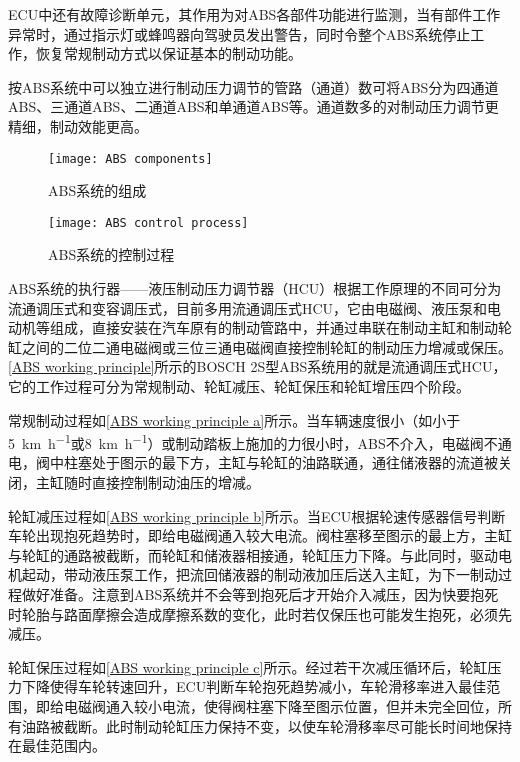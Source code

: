 \documentclass[UTF8]{ctexart}
\numberwithin{figure}{section}
\numberwithin{table}{section}
\begin{document}
ECU中还有故障诊断单元，其作用为对ABS各部件功能进行监测，当有部件工作异常时，通过指示灯或蜂鸣器向驾驶员发出警告，同时令整个ABS系统停止工作，恢复常规制动方式以保证基本的制动功能。

按ABS系统中可以独立进行制动压力调节的管路（通道）数可将ABS分为四通道ABS、三通道ABS、二通道ABS和单通道ABS等。通道数多的对制动压力调节更精细，制动效能更高。

\begin{figure}[htbp]
	\centering
	\begin{minipage}[b]{0.8\textwidth}
		\centering
		\texttt{[image: ABS components]}
		\caption{ABS系统的组成}
		\label{ABS components}
	\end{minipage}
	\begin{minipage}[b]{0.8\textwidth}
		\centering
		\texttt{[image: ABS control process]}
		\caption{ABS系统的控制过程}
		\label{ABS control process}
	\end{minipage}
\end{figure}

ABS系统的执行器——液压制动压力调节器（HCU）根据工作原理的不同可分为流通调压式和变容调压式，目前多用流通调压式HCU，它由电磁阀、液压泵和电动机等组成，直接安装在汽车原有的制动管路中，并通过串联在制动主缸和制动轮缸之间的二位二通电磁阀或三位三通电磁阀直接控制轮缸的制动压力增减或保压。\cref{ABS working principle}所示的BOSCH 2S型ABS系统用的就是流通调压式HCU，它的工作过程可分为常规制动、轮缸减压、轮缸保压和轮缸增压四个阶段。

常规制动过程如\cref{ABS working principle a}所示。当车辆速度很小（如小于\SI[per-mode = symbol]{5}{\km\per\hour}或\SI[per-mode = symbol]{8}{\km\per\hour}）或制动踏板上施加的力很小时，ABS不介入，电磁阀不通电，阀中柱塞处于图示的最下方，主缸与轮缸的油路联通，通往储液器的流道被关闭，主缸随时直接控制制动油压的增减。

轮缸减压过程如\cref{ABS working principle b}所示。当ECU根据轮速传感器信号判断车轮出现抱死趋势时，即给电磁阀通入较大电流。阀柱塞移至图示的最上方，主缸与轮缸的通路被截断，而轮缸和储液器相接通，轮缸压力下降。与此同时，驱动电机起动，带动液压泵工作，把流回储液器的制动液加压后送入主缸，为下一制动过程做好准备。注意到ABS系统并不会等到抱死后才开始介入减压，因为快要抱死时轮胎与路面摩擦会造成摩擦系数的变化，此时若仅保压也可能发生抱死，必须先减压。

轮缸保压过程如\cref{ABS working principle c}所示。经过若干次减压循环后，轮缸压力下降使得车轮转速回升，ECU判断车轮抱死趋势减小，车轮滑移率进入最佳范围，即给电磁阀通入较小电流，使得阀柱塞下降至图示位置，但并未完全回位，所有油路被截断。此时制动轮缸压力保持不变，以使车轮滑移率尽可能长时间地保持在最佳范围内。
\end{document}
